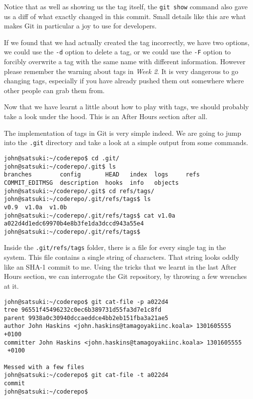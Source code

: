 Notice that as well as showing us the tag itself, the \texttt{git show} command also gave us a diff of what exactly changed in this commit.  Small details like this are what makes Git in particular a joy to use for developers.

If we found that we had actually created the tag incorrectly, we have two options, we could use the \texttt{-d} option to delete a tag, or we could use the \texttt{-F} option to forcibly overwrite a tag with the same name with different information.  However please remember the warning about tags in \emph{Week 2}.  It is very dangerous to go changing tags, especially if you have already pushed them out somewhere where other people can grab them from.

Now that we have learnt a little about how to play with tags, we should probably take a look under the hood.  This is an After Hours section after all.

The implementation of tags in Git is very simple indeed.  We are going to jump into the \texttt{.git} directory and take a look at a simple output from some commands.

\begin{Verbatim}
john@satsuki:~/coderepo$ cd .git/
john@satsuki:~/coderepo/.git$ ls
branches        config       HEAD   index  logs     refs
COMMIT_EDITMSG  description  hooks  info   objects
john@satsuki:~/coderepo/.git$ cd refs/tags/
john@satsuki:~/coderepo/.git/refs/tags$ ls
v0.9  v1.0a  v1.0b
john@satsuki:~/coderepo/.git/refs/tags$ cat v1.0a
a022d4d1edc69970b4e8b3fe1da3dccd943a55e4
john@satsuki:~/coderepo/.git/refs/tags$ 
\end{Verbatim}

Inside the \texttt{.git/refs/tags} folder, there is a file for every single tag in the system.  This file contains a single string of characters.  That string looks oddly like an SHA-1 commit to me.  Using the tricks that we learnt in the last After Hours section, we can interrogate the Git repository, by throwing a few wrenches at it.

\begin{Verbatim}
john@satsuki:~/coderepo$ git cat-file -p a022d4
tree 96551f45496232c0ec6b389731d55fa3d7e1c8fd
parent 9938a0c30940dccaeddce4bb2eb151fba3a21ae5
author John Haskins <john.haskins@tamagoyakiinc.koala> 1301605555 +0100
committer John Haskins <john.haskins@tamagoyakiinc.koala> 1301605555 
 +0100

Messed with a few files
john@satsuki:~/coderepo$ git cat-file -t a022d4
commit
john@satsuki:~/coderepo$ 
\end{Verbatim}


